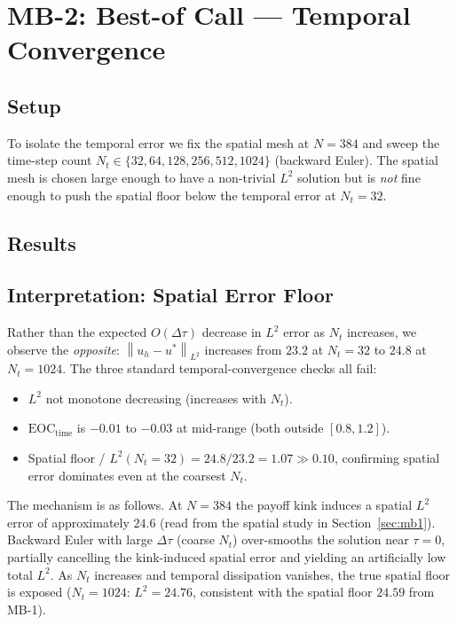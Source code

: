 \documentclass[11pt,a4paper]{article}
\newcommand{\norm}[1]{\left\|#1\right\|}
\newcommand{\eoc}{\mathrm{EOC}}
\begin{document}
\section{MB-2: Best-of Call --- Temporal Convergence}
\label{sec:mb2}

\subsection{Setup}

To isolate the temporal error we fix the spatial mesh at $N=384$ and sweep
the time-step count $N_t \in \{32, 64, 128, 256, 512, 1024\}$ (backward Euler).
The spatial mesh is chosen large enough to have a non-trivial $L^2$ solution but
is \emph{not} fine enough to push the spatial floor below the temporal error
at $N_t=32$.

\subsection{Results}

\tableBestofTemporalConvergence

\subsection{Interpretation: Spatial Error Floor}

Rather than the expected $O(\Delta\tau)$ decrease in $L^2$ error as $N_t$
increases, we observe the \emph{opposite}: $\norm{u_h - u^*}_{L^2}$ increases
from $23.2$ at $N_t=32$ to $24.8$ at $N_t=1024$.  The three standard
temporal-convergence checks all fail:
\begin{itemize}
  \item $L^2$ not monotone decreasing (increases with $N_t$).
  \item $\eoc_{\text{time}}$ is $-0.01$ to $-0.03$ at mid-range (both outside $[0.8,1.2]$).
  \item Spatial floor / $L^2(N_t=32) = 24.8/23.2 = 1.07 \gg 0.10$, confirming
        spatial error dominates even at the coarsest $N_t$.
\end{itemize}

The mechanism is as follows.  At $N=384$ the payoff kink induces a spatial $L^2$
error of approximately $24.6$ (read from the spatial study in Section~\ref{sec:mb1}).
Backward Euler with large $\Delta\tau$ (coarse $N_t$) over-smooths the solution near
$\tau=0$, partially cancelling the kink-induced spatial error and yielding an
artificially low total $L^2$.  As $N_t$ increases and temporal dissipation vanishes,
the true spatial floor is exposed ($N_t=1024$: $L^2 = 24.76$, consistent with the
spatial floor $24.59$ from MB-1).
\end{document}
